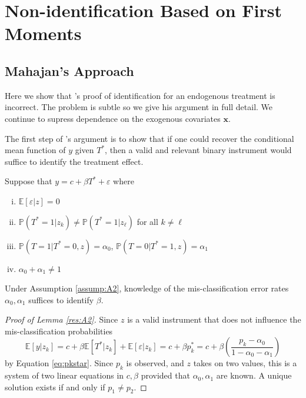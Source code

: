\section{Non-identification Based on First Moments}

\subsection{Mahajan's Approach}
Here we show that \citeauthor{Mahajan}'s proof of identification for an endogenous treatment is incorrect.
The problem is subtle so we give his argument in full detail.
We continue to supress dependence on the exogenous covariates $\mathbf{x}$.

The first step of \citeauthor{Mahajan}'s argument is to show that if one could recover the conditional mean function of $y$ given $T^*$, then a valid and relevant binary instrument would suffice to identify the treatment effect.  
\begin{assump}[Mahajan A2]\mbox{}
  \label{assump:A2} Suppose that $y = c+ \beta T^* + \varepsilon$ where
  \begin{enumerate}[(i)]
    \item $\mathbb{E}[\varepsilon|z]=0$
    \item $\mathbb{P}(T^*=1|z_k)\neq \mathbb{P}(T^*=1|z_\ell)$ for all $k\neq \ell$
    \item $\mathbb{P}(T = 1| T^* = 0, z) = \alpha_0$, $\mathbb{P}(T = 0| T^* = 1, z) = \alpha_1$
    \item $\alpha_0 + \alpha_1 \neq 1$
  \end{enumerate}
\end{assump}

\begin{lem}[Mahajan A2]
  \label{res:A2}
Under Assumption \ref{assump:A2}, knowledge of the mis-classification error rates $\alpha_0, \alpha_1$ suffices to identify $\beta$.
\end{lem}
\begin{proof}[Proof of Lemma \ref{res:A2}]
Since $z$ is a valid instrument that does not influence the mis-classification probabilities
\[\mathbb{E}[y|z_k] = c + \beta \mathbb{E}[T^*|z_k] + \mathbb{E}[\varepsilon|z_k] = c + \beta p_k^* = c + \beta \left( \frac{p_k - \alpha_0}{1 - \alpha_0 - \alpha_1} \right)\]
by Equation \ref{eq:pkstar}.
Since $p_k$ is observed, and $z$ takes on two values, this is a system of two linear equations in $c,\beta$ provided that $\alpha_0,\alpha_1$ are known.
A unique solution exists if and only if $p_1 \neq p_2$.
\end{proof}

